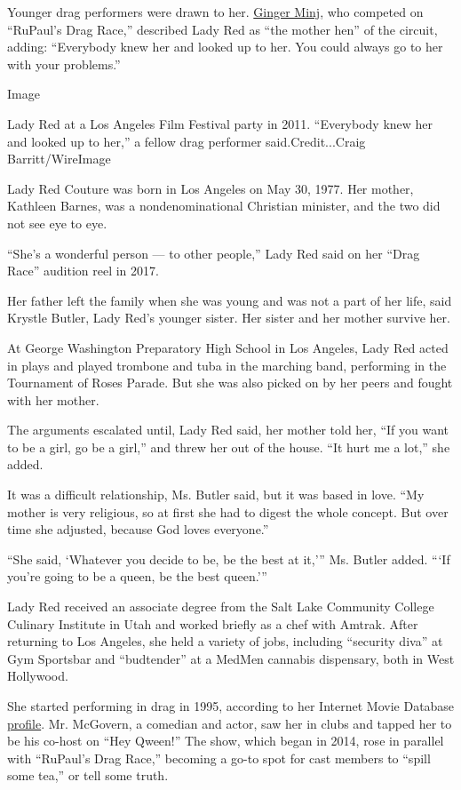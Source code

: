 Younger drag performers were drawn to her.
\href{https://gingerminj.com/}{Ginger Minj}, who competed on ``RuPaul's
Drag Race,'' described Lady Red as ``the mother hen'' of the circuit,
adding: ``Everybody knew her and looked up to her. You could always go
to her with your problems.''

Image

Lady Red at a Los Angeles Film Festival party in 2011. ``Everybody knew
her and looked up to her,'' a fellow drag performer said.Credit...Craig
Barritt/WireImage

Lady Red Couture was born in Los Angeles on May 30, 1977. Her mother,
Kathleen Barnes, was a nondenominational Christian minister, and the two
did not see eye to eye.

``She's a wonderful person --- to other people,'' Lady Red said on her
``Drag Race'' audition reel in 2017.

Her father left the family when she was young and was not a part of her
life, said Krystle Butler, Lady Red's younger sister. Her sister and her
mother survive her.

At George Washington Preparatory High School in Los Angeles, Lady Red
acted in plays and played trombone and tuba in the marching band,
performing in the Tournament of Roses Parade. But she was also picked on
by her peers and fought with her mother.

The arguments escalated until, Lady Red said, her mother told her, ``If
you want to be a girl, go be a girl,'' and threw her out of the house.
``It hurt me a lot,'' she added.

It was a difficult relationship, Ms. Butler said, but it was based in
love. ``My mother is very religious, so at first she had to digest the
whole concept. But over time she adjusted, because God loves everyone.''

``She said, `Whatever you decide to be, be the best at it,''' Ms. Butler
added. ```If you're going to be a queen, be the best queen.'''

Lady Red received an associate degree from the Salt Lake Community
College Culinary Institute in Utah and worked briefly as a chef with
Amtrak. After returning to Los Angeles, she held a variety of jobs,
including ``security diva'' at Gym Sportsbar and ``budtender'' at a
MedMen cannabis dispensary, both in West Hollywood.

She started performing in drag in 1995, according to her Internet Movie
Database
\href{https://www.imdb.com/name/nm4366207/bio?ref_=nm_ov_bio_sm}{profile}.
Mr. McGovern, a comedian and actor, saw her in clubs and tapped her to
be his co-host on ``Hey Qween!'' The show, which began in 2014, rose in
parallel with ``RuPaul's Drag Race,'' becoming a go-to spot for cast
members to ``spill some tea,'' or tell some truth.

